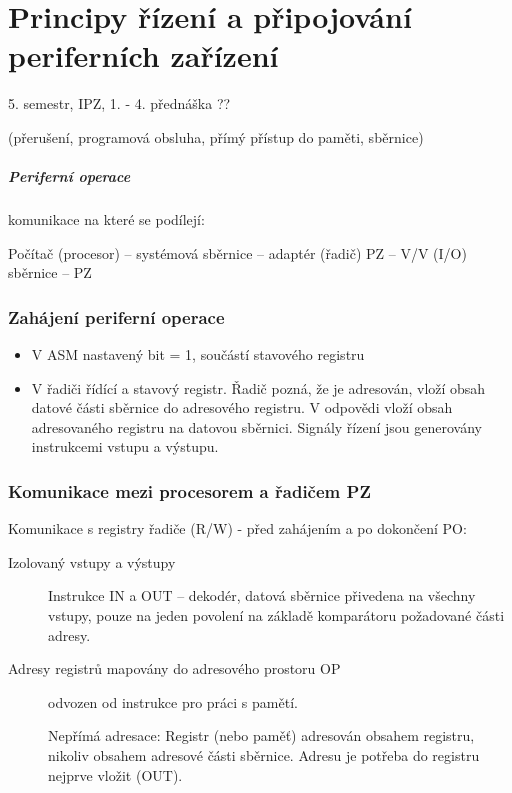 \documentclass[a4paper, 11pt]{report}
\begin{document}
\chapter{Principy řízení a připojování periferních zařízení} \label{cha:6}

5. semestr, IPZ, 1. - 4. přednáška ??

(přerušení, programová obsluha, přímý přístup do paměti, sběrnice)

\paragraph{Periferní operace} komunikace na které se podílejí:

Počítač (procesor) -- systémová sběrnice -- adaptér (řadič) PZ -- V/V (I/O) sběrnice -- PZ

\subsection{Zahájení periferní operace}

\begin{itemize}
	\item V ASM nastavený bit  = 1, součástí stavového registru
	\item V řadiči řídící a stavový registr. Řadič pozná, že je adresován, vloží obsah datové části sběrnice do adresového registru. V odpovědi vloží obsah adresovaného registru na datovou sběrnici. Signály řízení jsou generovány instrukcemi vstupu a výstupu.
\end{itemize}

\subsection{Komunikace mezi procesorem a  řadičem PZ}

Komunikace s registry řadiče (R/W) - před zahájením a po dokončení PO:
\begin{description}
	\item[Izolovaný vstupy a výstupy] Instrukce IN a OUT -- dekodér, datová sběrnice přivedena na všechny vstupy, pouze na jeden povolení na základě komparátoru požadované části adresy. 
	\item[Adresy registrů mapovány do adresového prostoru OP]  odvozen od instrukce pro práci s pamětí.
	
	Nepřímá adresace: Registr (nebo paměť) adresován obsahem registru, nikoliv obsahem adresové části sběrnice. Adresu je potřeba do registru nejprve vložit (OUT).
\end{description}
\end{document}
